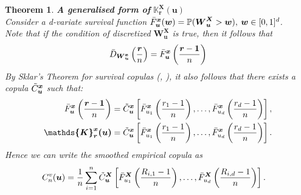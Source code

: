 \documentclass[12pt]{report}
\newtheorem{theorem}{Theorem}[subsection]
\newcommand{\1}{\mathbf{1}}
\begin{document}
\begin{theorem}\label{sklaronsmoothcopula}
\textit{\normalfont\parencite{KojadinovicYi2024Smooth}}\:
\textbf{A generalised form of} $\boldsymbol{\mathds{K}_{\boldsymbol{r}}^{\boldsymbol{X}}(\boldsymbol{u})}$ \\
Consider a d-variate survival function $\Bar{F}_{\boldsymbol{u}}^{\boldsymbol{x}}(\boldsymbol{w}) = \mathbb{P} (\boldsymbol{W}^{\boldsymbol{X}}_{\boldsymbol{u}} > \boldsymbol{w} ), \: \boldsymbol{w} \in [0,1]^{d}$.\\
Note that if the condition of discretized $\textbf{W}^{\textbf{X}}_{\textbf{u}}$ is true, then it follows that
\begin{align*}
\Bar{D}_{\boldsymbol{W}^{\boldsymbol{x}}_{\boldsymbol{u}}}\left(\frac{\boldsymbol{r}}{n}\right) = \Bar{F}_{\boldsymbol{u}}^{\boldsymbol{x}}\left(\frac{\boldsymbol{r} - \boldsymbol{1}}{n}\right)
\end{align*}
By Sklar's Theorem for survival copulas (\cite{HofertBook}, \cite{SklarTheorem}), it also follows that there exists a copula $\Tilde{C}_{\boldsymbol{u}}^{\boldsymbol{x}}$ such that:
\begin{align*}
\Bar{F}_{\boldsymbol{u}}^{\boldsymbol{x}}\left(\frac{\boldsymbol{r} - \boldsymbol{1}}{n}\right) &= \Tilde{C}_{\boldsymbol{u}}^{\boldsymbol{x}} \left[\Bar{F}_{u_{1}}^{\boldsymbol{x}}\left(\frac{r_{1} - 1}{n}\right), \dots, \Bar{F}_{u_{d}}^{\boldsymbol{x}}\left(\frac{r_{d} - 1}{n}\right) \right],\\
\boldsymbol{\mathds{K}_{\boldsymbol{r}}^{\boldsymbol{x}}(\boldsymbol{u})} &= \Tilde{C}_{\boldsymbol{u}}^{\boldsymbol{x}} \left[\Bar{F}_{u_{1}}^{\boldsymbol{x}}\left(\frac{r_{1} - 1}{n}\right), \dots, \Bar{F}_{u_{d}}^{\boldsymbol{x}}\left(\frac{r_{d} - 1}{n}\right) \right].
\end{align*}
Hence we can write the smoothed empirical copula as
\begin{align*}
C_{n}^{v}(\boldsymbol{u}) &= \frac{1}{n} \sum\limits_{i = 1}^{n} \Tilde{C}_{\boldsymbol{u}}^{\boldsymbol{X}} \left[\Bar{F}_{u_{1}}^{\boldsymbol{X}}\left(\frac{R_{i,1} - 1}{n}\right), \dots, \Bar{F}_{u_{d}}^{\boldsymbol{X}}\left(\frac{R_{i,d} - 1}{n}\right) \right].
\end{align*}
\end{theorem}
\end{document}
